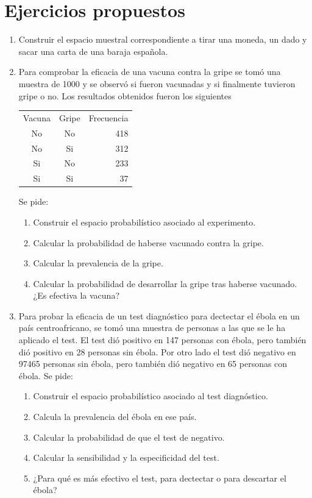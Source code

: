 \section{Ejercicios propuestos}
\begin{enumerate}[leftmargin=*]
\item Construir el espacio muestral correspondiente a tirar una moneda, un dado y sacar una carta de una baraja española. 

\item Para comprobar la eficacia de una vacuna contra la gripe se tomó una muestra de 1000 y se observó si fueron vacunadas y si finalmente
tuvieron gripe o no. 
Los resultados obtenidos fueron los siguientes
\begin{center}
\begin{tabular}{ccr}
\hline
Vacuna & Gripe & Frecuencia\\
No & No & 418\\
No & Si & 312\\
Si & No & 233\\
Si & Si & 37\\
\hline
\end{tabular}
\end{center}
Se pide:
\begin{enumerate}
\item Construir el espacio probabilístico asociado al experimento.
\item Calcular la probabilidad de haberse vacunado contra la gripe.  
\item Calcular la prevalencia de la gripe.
\item Calcular la probabilidad de desarrollar la gripe tras haberse vacunado.
¿Es efectiva la vacuna?
\end{enumerate}

\item Para probar la eficacia de un test diagnóstico para dectectar el ébola en un país centroafricano, se tomó una muestra de personas
a las que se le ha aplicado el test. 
El test dió positivo en 147 personas con ébola, pero también dió positivo en 28 personas sin ébola. 
Por otro lado el test dió negativo en 97465 personas sin ébola, pero también dió negativo en 65 personas con ébola.
Se pide:
\begin{enumerate}
\item Construir el espacio probabilístico asociado al test diagnóstico.
\item Calcula la prevalencia del ébola en ese país.
\item Calcular la probabilidad de que el test de negativo. 
\item Calcular la sensibilidad y la especificidad del test.  
\item ¿Para qué es más efectivo el test, para dectectar o para descartar el ébola?
\end{enumerate} 
\end{enumerate}







